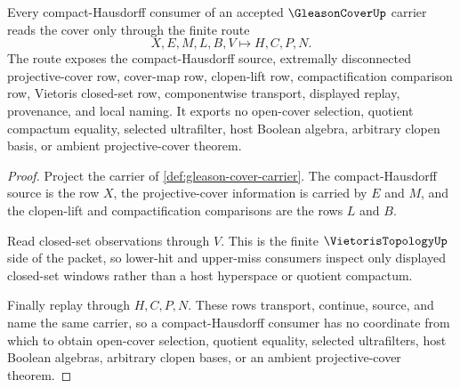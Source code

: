 \begin{theorem}
\label{thm:gleason-cover-projective-cover-handoff}
Every compact-Hausdorff consumer of an accepted $\GleasonCoverUp$ carrier reads the cover only through the finite route
$$
X,E,M,L,B,V \longmapsto H,C,P,N .
$$
The route exposes the compact-Hausdorff source, extremally disconnected projective-cover row, cover-map row, clopen-lift row, compactification comparison row, Vietoris closed-set row, componentwise transport, displayed replay, provenance, and local naming. It exports no open-cover selection, quotient compactum equality, selected ultrafilter, host Boolean algebra, arbitrary clopen basis, or ambient projective-cover theorem.
\end{theorem}
\begin{proof}
Project the carrier of \autoref{def:gleason-cover-carrier}. The compact-Hausdorff source is the row $X$, the projective-cover information is carried by $E$ and $M$, and the clopen-lift and compactification comparisons are the rows $L$ and $B$.

Read closed-set observations through $V$. This is the finite $\VietorisTopologyUp$ side of the packet, so lower-hit and upper-miss consumers inspect only displayed closed-set windows rather than a host hyperspace or quotient compactum.

Finally replay through $H,C,P,N$. These rows transport, continue, source, and name the same carrier, so a compact-Hausdorff consumer has no coordinate from which to obtain open-cover selection, quotient equality, selected ultrafilters, host Boolean algebras, arbitrary clopen bases, or an ambient projective-cover theorem.
\end{proof}


\begin{closurestatus}{\GleasonCoverUp}
  \theoryclosure{\seedClosure}
  \formalstatus{\unformalizedV}
\end{closurestatus}
